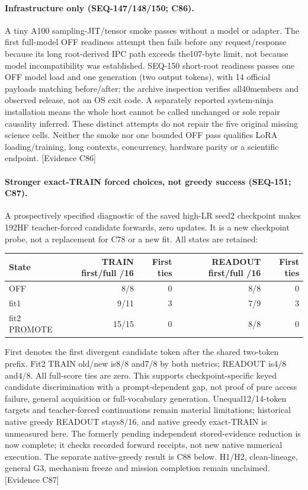 \documentclass[11pt]{article}
\begin{document}
\paragraph{Infrastructure only (SEQ-147/148/150; C86).}
A tiny A100 sampling-JIT/tensor smoke passes without a model or adapter. The first
full-model OFF readiness attempt then fails before any request/response because
its long root-derived IPC path exceeds the107-byte limit, not because model
incompatibility was established. SEQ-150 short-root readiness passes one OFF
model load and one generation (two output tokens), with 14 official payloads
matching before/after; the archive inspection verifies all40members and observed
release, not an OS exit code. A separately reported system-ninja installation
means the whole host cannot be called unchanged or sole repair causality inferred.
These distinct attempts do not repair the five original missing science cells.
Neither the smoke nor one bounded OFF pass qualifies LoRA loading/training,
long contexts, concurrency, hardware parity or a scientific endpoint.
\textsf{[Evidence C86]}

\paragraph{Stronger exact-TRAIN forced choices, not greedy success (SEQ-151; C87).}
A prospectively specified diagnostic of the saved high-LR seed2 checkpoint makes
192HF teacher-forced candidate forwards, zero updates. It is a new checkpoint
probe, not a replacement for C78 or a new fit. All states are retained:
\begin{center}\small
\begin{tabular}{lrrrr}
\toprule
State & TRAIN first/full /16 & First ties & READOUT first/full /16 & First ties \\
\midrule
OFF & 8/8 & 0 & 8/8 & 0 \\
fit1 & 9/11 & 3 & 7/9 & 3 \\
fit2 PROMOTE & 15/15 & 0 & 8/8 & 0 \\
\bottomrule
\end{tabular}
\end{center}
First denotes the first divergent candidate token after the shared two-token prefix.
Fit2 TRAIN old/new is8/8 and7/8 by both metrics; READOUT is4/8 and4/8.
All full-score ties are zero. This supports checkpoint-specific keyed candidate
discrimination with a prompt-dependent gap, not proof of pure access failure,
general acquisition or full-vocabulary generation. Unequal12/14-token targets
and teacher-forced continuations remain material limitations; historical native
greedy READOUT stays8/16, and native greedy exact-TRAIN is unmeasured here.
The formerly pending independent stored-evidence reduction is now complete;
it checks recorded forward receipts, not new native numerical execution.
The separate native-greedy result is C88 below. H1/H2, clean-lineage, general G3, mechanism freeze and
mission completion remain unclaimed. \textsf{[Evidence C87]}
\end{document}

